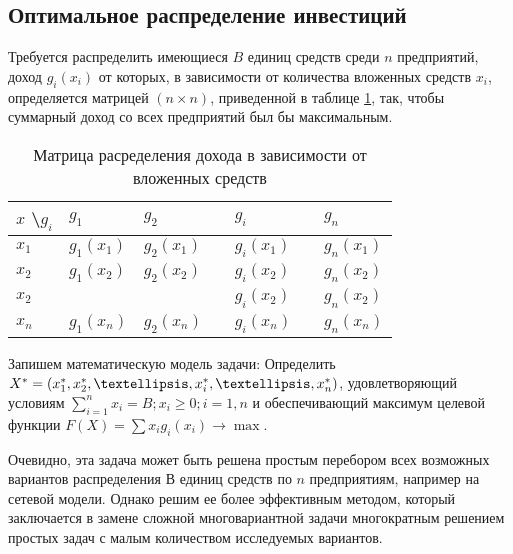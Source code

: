 \subsection{Оптимальное распределение инвестиций}

Требуется распределить имеющиеся $B$ единиц средств среди $n$ предприятий, доход $g_i(x_i)$ от которых, в зависимости от количества вложенных средств $x_i$, определяется матрицей $(n \times n)$, приведенной в таблице \ref{table:opt:initial:data}, так, чтобы суммарный доход со всех предприятий был бы максимальным.

\begin{table}[!ht]
	\caption{Матрица расределения дохода в зависимости от вложенных средств}
	\label{table:opt:initial:data}
  \centering
  \begin{tabularx}{\linewidth}{ |X|X|X|X|X|X|X| }
	\hline
	$x$ \textbackslash $g_i$ & $g_1$ & $g_2$ & \textellipsis & $g_i$ & \textellipsis & $g_n$ \\
	\hline
	$x_1$ & $g_1(x_1)$ & $g_2(x_1)$ & \textellipsis & $g_i(x_1)$ & \textellipsis & $g_n(x_1)$ \\
	\hline
	$x_2$ & $g_1(x_2)$ & $g_2(x_2)$ & \textellipsis & $g_i(x_2)$ & \textellipsis & $g_n(x_2)$ \\
	\hline
	$x_2$ & \textellipsis & \textellipsis & \textellipsis & $g_i(x_2)$ & \textellipsis & $g_n(x_2)$ \\
	\hline
	$x_n$ & $g_1(x_n)$ & $g_2(x_n)$ & \textellipsis & $g_i(x_n)$ & \textellipsis & $g_n(x_n)$ \\
	\hline
  \end{tabularx}
\end{table}

Запишем математическую модель задачи: Определить $X^* = (x^*_1,x^*_2,\textellipsis,x^*_i,\textellipsis,x^*_n)$, удовлетворяющий условиям $\sum_{i=1}^n x_i = B; x_i \geq 0; i = 1, n$ и обеспечивающий максимум целевой функции $F(X) = \sum x_i g_i (x_i) \rightarrow \max$.

Очевидно, эта задача может быть решена простым перебором всех возможных вариантов распределения $В$ единиц средств по $n$ предприятиям, например на сетевой модели. Однако решим ее более эффективным методом, который заключается в замене сложной многовариантной задачи многократным решением простых задач с малым количеством исследуемых вариантов.

